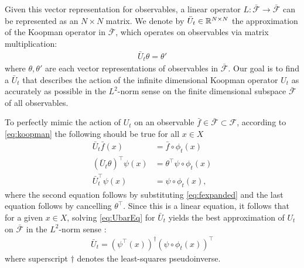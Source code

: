 Given this vector representation for observables, a linear operator $L : \bar{\mathcal{F}} \to \bar{\mathcal{F}}$ can be represented as an ${N \times N}$ matrix. 
We denote by $\bar{U}_t \in \mathbb{R}^{N \times N}$ the approximation of the Koopman operator in $\bar{\mathcal{F}}$, which operates on observables via matrix multiplication:
\begin{align}
    \bar{U}_t \theta = \theta'
\end{align}
where $\theta , \theta'$ are each vector representations of observables in $\bar{\mathcal{F}}$.
Our goal is to find a $\bar{U}_t$ that describes the action of the infinite dimensional Koopman operator $U_t$ as accurately as possible in the $L^2$-norm sense on the finite dimensional subspace $\bar{\mathcal{F}}$ of all observables.

To perfectly mimic the action of $U_t$ on an observable ${\bar{f} \in \bar{\mathcal{F}} \subset \mathcal{F}}$, according to \eqref{eq:koopman} the following should be true for all  $x \in X$
\begin{align}
    \bar{U}_t \bar{f}(x) &= \bar{f} \circ \phi_t(x) \\
    ( \bar{U}_t {\theta} )^\top {\psi}(x) &=
    {\theta}^\top {\psi} \circ \phi_t(x) \\
    \bar{U}_t^\top \psi(x) &= {\psi} \circ \phi_t(x),
    \label{eq:UbarEq}
\end{align}
where the second equation follows by substituting \eqref{eq:fexpanded} and the last equation follows by cancelling $\theta^\top$.
Since this is a linear equation, it follows that for a given ${x \in X}$, solving \eqref{eq:UbarEq} for $\bar{U}_t$ yields the best approximation of $U_t$ on $\bar{\mathcal{F}}$ in the $L^2$-norm sense \cite{penrose1956best}:
\begin{align}
    \bar{U}_t = \left( {\psi}^\top(x) \right)^\dagger ( {\psi} \circ \phi_t(x) )^\top
    \label{eq:Uapprox}
\end{align}
where superscript $\dagger$ denotes the least-squares pseudoinverse.

